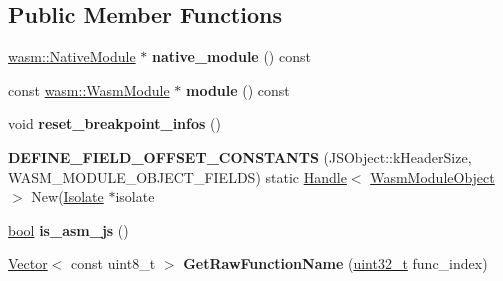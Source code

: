 \subsection*{Public Member Functions}
\begin{DoxyCompactItemize}
\item 
\mbox{\label{classv8_1_1internal_1_1WasmModuleObject_ad0bfa4a428febfc11d70a2f7751ef935}} 
\mbox{\hyperlink{classv8_1_1internal_1_1wasm_1_1NativeModule}{wasm\+::\+Native\+Module}} $\ast$ {\bfseries native\+\_\+module} () const
\item 
\mbox{\label{classv8_1_1internal_1_1WasmModuleObject_ab44fb59800de5bb58e0c1ef4f8dbaee1}} 
const \mbox{\hyperlink{structv8_1_1internal_1_1wasm_1_1WasmModule}{wasm\+::\+Wasm\+Module}} $\ast$ {\bfseries module} () const
\item 
\mbox{\label{classv8_1_1internal_1_1WasmModuleObject_a842d04bd505ce431d5a5a0e909833939}} 
void {\bfseries reset\+\_\+breakpoint\+\_\+infos} ()
\item 
\mbox{\label{classv8_1_1internal_1_1WasmModuleObject_a9f4be490f0f99fe0284aab1eee3fd9ea}} 
{\bfseries D\+E\+F\+I\+N\+E\+\_\+\+F\+I\+E\+L\+D\+\_\+\+O\+F\+F\+S\+E\+T\+\_\+\+C\+O\+N\+S\+T\+A\+N\+TS} (J\+S\+Object\+::k\+Header\+Size, W\+A\+S\+M\+\_\+\+M\+O\+D\+U\+L\+E\+\_\+\+O\+B\+J\+E\+C\+T\+\_\+\+F\+I\+E\+L\+DS) static \mbox{\hyperlink{classv8_1_1internal_1_1Handle}{Handle}}$<$ \mbox{\hyperlink{classv8_1_1internal_1_1WasmModuleObject}{Wasm\+Module\+Object}} $>$ New(\mbox{\hyperlink{classv8_1_1internal_1_1Isolate}{Isolate}} $\ast$isolate
\item 
\mbox{\label{classv8_1_1internal_1_1WasmModuleObject_a0fb3204fee294be5e43a15a7d161d2e7}} 
\mbox{\hyperlink{classbool}{bool}} {\bfseries is\+\_\+asm\+\_\+js} ()
\item 
\mbox{\label{classv8_1_1internal_1_1WasmModuleObject_a1f85a21d4ec075dfa572c90f3ba93608}} 
\mbox{\hyperlink{classv8_1_1internal_1_1Vector}{Vector}}$<$ const uint8\+\_\+t $>$ {\bfseries Get\+Raw\+Function\+Name} (\mbox{\hyperlink{classuint32__t}{uint32\+\_\+t}} func\+\_\+index)

\end{DoxyCompactItemize}
